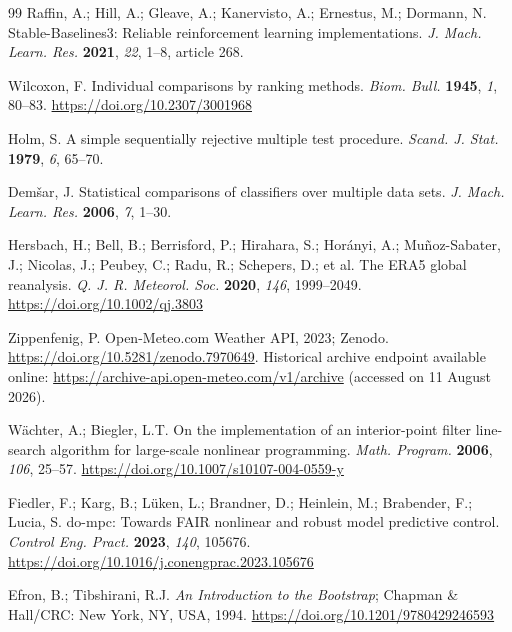 \begin{thebibliography}{99}
Raffin, A.; Hill, A.; Gleave, A.; Kanervisto, A.; Ernestus, M.; Dormann, N.
Stable-Baselines3: Reliable reinforcement learning implementations. \textit{J. Mach. Learn.
Res.} \textbf{2021}, \textit{22}, 1--8, article 268.

Wilcoxon, F. Individual comparisons by ranking methods. \textit{Biom. Bull.} \textbf{1945},
\textit{1}, 80--83. \url{https://doi.org/10.2307/3001968}

Holm, S. A simple sequentially rejective multiple test procedure. \textit{Scand. J. Stat.}
\textbf{1979}, \textit{6}, 65--70.

Dem\v{s}ar, J. Statistical comparisons of classifiers over multiple data sets.
\textit{J. Mach. Learn. Res.} \textbf{2006}, \textit{7}, 1--30.

Hersbach, H.; Bell, B.; Berrisford, P.; Hirahara, S.; Hor\'anyi, A.; Mu\~noz-Sabater, J.;
Nicolas, J.; Peubey, C.; Radu, R.; Schepers, D.; et al. The ERA5 global reanalysis.
\textit{Q. J. R. Meteorol. Soc.} \textbf{2020}, \textit{146}, 1999--2049.
\url{https://doi.org/10.1002/qj.3803}

Zippenfenig, P. Open-Meteo.com Weather API, 2023; Zenodo.
\url{https://doi.org/10.5281/zenodo.7970649}. Historical archive endpoint available online:
\url{https://archive-api.open-meteo.com/v1/archive} (accessed on 11 August 2026).

W\"achter, A.; Biegler, L.T. On the implementation of an interior-point filter line-search
algorithm for large-scale nonlinear programming. \textit{Math. Program.} \textbf{2006},
\textit{106}, 25--57. \url{https://doi.org/10.1007/s10107-004-0559-y}

Fiedler, F.; Karg, B.; L\"uken, L.; Brandner, D.; Heinlein, M.; Brabender, F.; Lucia, S.
do-mpc: Towards FAIR nonlinear and robust model predictive control. \textit{Control Eng.
Pract.} \textbf{2023}, \textit{140}, 105676.
\url{https://doi.org/10.1016/j.conengprac.2023.105676}

Efron, B.; Tibshirani, R.J. \textit{An Introduction to the Bootstrap}; Chapman \& Hall/CRC:
New York, NY, USA, 1994. \url{https://doi.org/10.1201/9780429246593}


\end{thebibliography}
